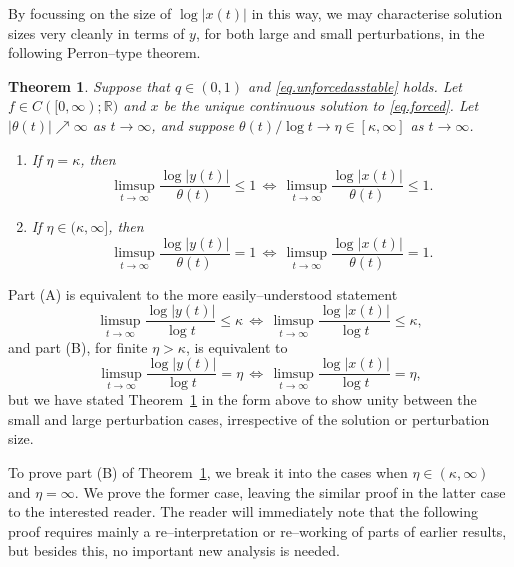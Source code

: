 \documentclass[a4paper,10pt,reqno]{amsart}
\numberwithin{equation}{section}
\newtheorem{theorem}{Theorem}
\theoremstyle{definition}
\theoremstyle{remark}
\DeclareMathOperator{\1}{\mathbbm 1}
\begin{document}
%
%
%

By focussing on the size of $\log |x(t)|$ in this way, we may characterise solution sizes very cleanly in terms of $y$, for both large and small perturbations, in the following Perron--type theorem. 
\begin{theorem} \label{thm.perronthm}
Suppose that $q\in (0,1)$ and \eqref{eq.unforcedasstable} holds. Let $f\in C([0,\infty);\mathbb{R})$ and $x$ be the unique continuous solution to \eqref{eq.forced}. Let $|\theta(t)|\nearrow  \infty$ as $t\to\infty$, and suppose $\theta(t)/\log t\to \eta\in [\kappa,\infty]$ as $t\to\infty$.  
\begin{enumerate}
	\item[(A)] If $\eta=\kappa$, then  
	\[
	\limsup_{t\to\infty} \frac{\log |y(t)|}{\theta(t)}\leq 1\, 
	\Longleftrightarrow\, \limsup_{t\to\infty} \frac{\log |x(t)|}{\theta(t)}\leq 1.
	\]
	\item[(B)] If $\eta\in (\kappa,\infty]$, then 
	\[
	\limsup_{t\to\infty} \frac{\log |y(t)|}{\theta(t)}=1\, 
	\Longleftrightarrow\, \limsup_{t\to\infty} \frac{\log |x(t)|}{\theta(t)}=1.
	\]
\end{enumerate}
\end{theorem}
Part (A) is equivalent to the more easily--understood statement 
\[
\limsup_{t\to\infty} \frac{\log |y(t)|}{\log t}\leq \kappa\, 
\Longleftrightarrow\, \limsup_{t\to\infty} \frac{\log |x(t)|}{\log t}\leq \kappa,
\] 
and part (B), for finite $\eta>\kappa$,  is equivalent to 
\[
\limsup_{t\to\infty} \frac{\log |y(t)|}{\log t}=\eta\, 
\Longleftrightarrow\, \limsup_{t\to\infty} \frac{\log |x(t)|}{\log t}=\eta,
\]
but we have stated Theorem~\ref{thm.perronthm} in the form above to show unity between the small and large perturbation cases, irrespective of the  solution or perturbation size. 

To prove part (B) of Theorem~\ref{thm.perronthm}, we break it into the cases when $\eta\in (\kappa,\infty)$ and $\eta=\infty$. We prove the former case, leaving the similar proof in the latter case to the interested reader. The reader will immediately note that the following proof requires mainly a re--interpretation or re--working of parts of earlier results, but besides this, no important new analysis is needed. 
\end{document}
